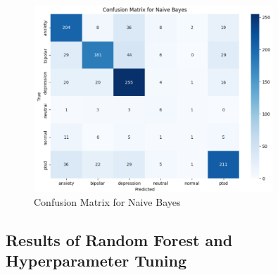  \begin{figure}[h!]  
    \centering
    \includegraphics[width=0.8\textwidth]{Images/Confusion Matrix NB.png}  
    \caption{Confusion Matrix for Naive Bayes}
    \label{Confusion Matrix NB}  %
    \end{figure}

\subsection{Results of Random Forest and Hyperparameter Tuning}

